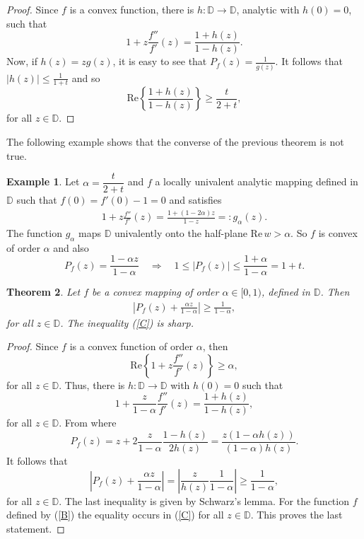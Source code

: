 \documentclass[reqno]{amsart}
\theoremstyle{plain}
\newtheorem{theo}{Theorem}[section]
\theoremstyle{definition}
\newtheorem{example}[theo]{Example}
\newcommand{\D}{\mathbb{D}}
\begin{document}
\begin{proof}
Since $f$ is a convex function, there is $h:\D \to \D$, analytic with $h(0)=0$, such that
\[1+z\frac{f''}{f'}(z)=\frac{1+h(z)}{1-h(z)}.\]
Now, if $h(z)=zg(z)$, it is easy to see that $P_f(z)=\displaystyle \frac{1}{g(z)}.$ It follows that $|h(z)|\leq \displaystyle \frac{1}{1+t}$ and so
\[\text{Re} \left\{\frac{1+h(z)}{1-h(z)}\right\}\geq \frac{t}{2+t},\]
for all $z\in\D$.
\end{proof}
The following example shows that the converse of the previous theorem is not true.

\begin{example}
Let $\alpha=\dfrac{t}{2+t}$ and $f$ a locally univalent analytic mapping defined in $\D$ such that $f(0)=f'(0)-1=0$ and satisfies
\begin{align} \label{B} 
    1+z\frac{f''}{f'}(z)=\frac{1+(1-2\alpha)z}{1-z}=:g_{\alpha}(z).
\end{align}
The function $g_{\alpha}$ maps $\D$ univalently onto the half-plane $\text{Re}\,w > \alpha$. So $f$ is convex of order $\alpha$ and also
\[P_f(z)=\frac{1-\alpha z}{1-\alpha}\quad \Rightarrow \quad  1\leq |P_f(z)|\leq \frac{1+\alpha}{1-\alpha}=1+t.\]
\end{example}


\begin{theo}
Let $f$ be a convex mapping of order $\alpha\in [0,1)$, defined in $\D$. Then 
\begin{align}\label{C}
 \left|P_f(z)+\frac{\alpha z}{1-\alpha}\right|\geq \frac{1}{1-\alpha},   
\end{align}
for all $z\in\D$. The inequality (\ref{C}) is sharp.
\end{theo}
\begin{proof}
    Since $f$ is a convex function of order $\alpha$, then
    \[\text{Re} \left\{1+z\frac{f''}{f'}(z)\right\}\geq \alpha,
    \]
    for all $z\in \D$. Thus, there is $h:\D \to \D$ with $h(0)=0$ such that 
    \[1+\frac{z}{1-\alpha}\frac{f''}{f'}(z)=\frac{1+h(z)}{1-h(z)},
    \]
    for all $z\in \D$.
    From where
    \[P_f(z)=z+2\frac{z}{1-\alpha}\frac{1-h(z)}{2h(z)}=\frac{z(1-\alpha h(z))}{(1-\alpha)h(z)}.\]
    It follows that
    \[\left|P_f(z)+\frac{\alpha z}{1-\alpha}\right|=\left|\frac{z}{h(z)}\frac{1}{1-\alpha}\right|\geq \frac{1}{1-\alpha},
    \]
    for all $z\in \D$. The last inequality is given by Schwarz's lemma.
For the function $f$ defined by (\ref{B}) the equality occurs in (\ref{C}) for all $z\in \D$. This proves the last statement.
\end{proof}
\end{document}
